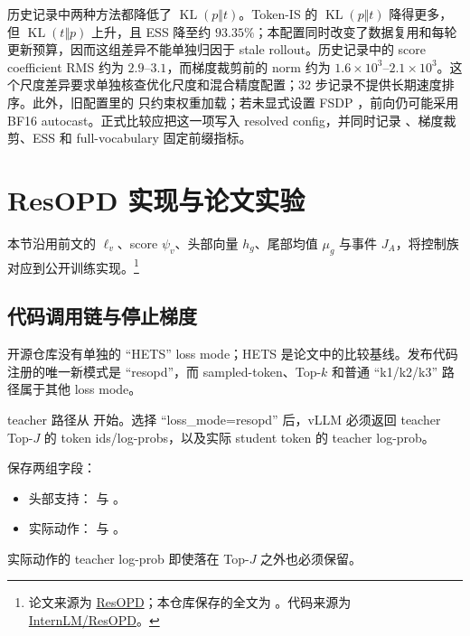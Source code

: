 \documentclass[lang=cn,scheme=chinese,openany]{../book/elegantbook}
\newcommand{\KL}{\operatorname{KL}}
\begin{document}
历史记录中两种方法都降低了 $\KL(p\Vert t)$。Token-IS 的 $\KL(p\Vert t)$ 降得更多，但 $\KL(t\Vert p)$ 上升，且 ESS 降至约 $93.35\%$；本配置同时改变了数据复用和每轮更新预算，因而这组差异不能单独归因于 stale rollout。历史记录中的 score coefficient RMS 约为 $2.9$--$3.1$，而梯度裁剪前的 norm 约为 $1.6\times10^3$--$2.1\times10^3$。这个尺度差异要求单独核查优化尺度和混合精度配置；32 步记录不提供长期速度排序。此外，旧配置里的  只约束权重加载；若未显式设置 FSDP ，前向仍可能采用 BF16 autocast。正式比较应把这一项写入 resolved config，并同时记录 、梯度裁剪、ESS 和 full-vocabulary 固定前缀指标。



\section{ResOPD 实现与论文实验}
\label{sec:resopd-implementation}

本节沿用前文的 $\ell_v$、score $\psi_v$、头部向量 $h_g$、尾部均值 $\mu_g$ 与事件 $J_A$，将控制族对应到公开训练实现。\footnote{论文来源为 \href{https://arxiv.org/abs/2610.04882}{ResOPD}；本仓库保存的全文为 。代码来源为 \href{https://github.com/InternLM/ResOPD}{InternLM/ResOPD}。}

\subsection{代码调用链与停止梯度}

开源仓库没有单独的 ``HETS'' loss mode；HETS 是论文中的比较基线。发布代码注册的唯一新模式是 ``resopd''，而 sampled-token、Top-$k$ 和普通 ``k1/k2/k3'' 路径属于其他 loss mode。

teacher 路径从  开始。选择 ``loss\_mode=resopd'' 后，vLLM 必须返回 teacher Top-$J$ 的 token ids/log-probs，以及实际 student token 的 teacher log-prob。

 保存两组字段：
\begin{itemize}
\item 头部支持： 与 。
\item 实际动作： 与 。
\end{itemize}
实际动作的 teacher log-prob 即使落在 Top-$J$ 之外也必须保留。
\end{document}

